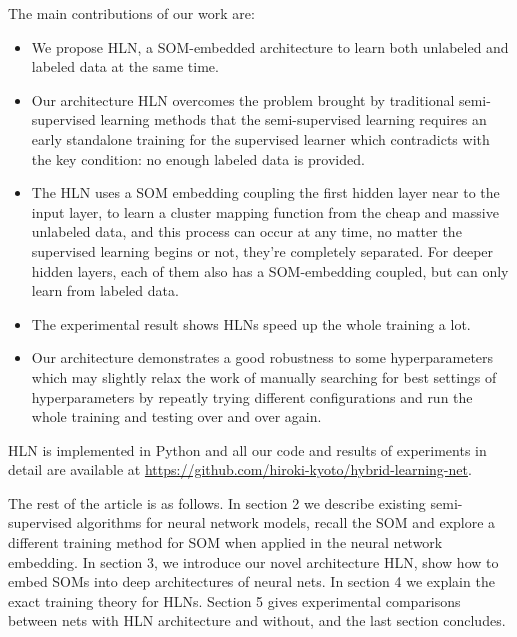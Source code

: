 \documentclass[3p,times,procedia]{elsarticle}
\begin{document}
The main contributions of our work are:
\begin{itemize}
\item We propose HLN, a SOM-embedded 
architecture to learn both unlabeled 
and labeled data at the same time.
\item Our architecture HLN overcomes
the problem brought by traditional 
semi-supervised learning methods that 
the semi-supervised learning requires
an early standalone training for the
supervised learner which contradicts
with the key condition: no enough 
labeled data is provided.
\item The HLN uses a SOM embedding 
coupling the first hidden layer near 
to the input layer, to learn a cluster 
mapping function from the cheap and 
massive unlabeled data, and this process
can occur at any time, no matter the 
supervised learning begins or not,
they're completely separated.
For deeper hidden layers, each of them 
also has a SOM-embedding coupled, 
but can only learn from labeled data.
\item The experimental result shows HLNs
speed up the whole training a lot.
\item Our architecture demonstrates a 
good robustness to some hyperparameters
which may slightly relax the work of 
manually searching for best settings
of hyperparameters by repeatly trying
different configurations and run the
whole training and testing over and 
over again.
\end{itemize}
HLN is implemented in Python and all
our code and results of experiments
in detail are available at
\url{https://github.com/hiroki-kyoto/hybrid-learning-net}.

The rest of the article is as follows.
In section 2 we describe existing
semi-supervised algorithms for neural
network models, recall
the SOM and explore a different
training method for SOM when applied in
the neural network embedding.
In section 3, we introduce our novel
architecture HLN, show how to
embed SOMs into deep architectures of
neural nets.
In section 4 we explain the exact 
training theory for HLNs.
Section 5 gives experimental
comparisons between nets with HLN
architecture and without, and the
last section concludes.
\end{document}
